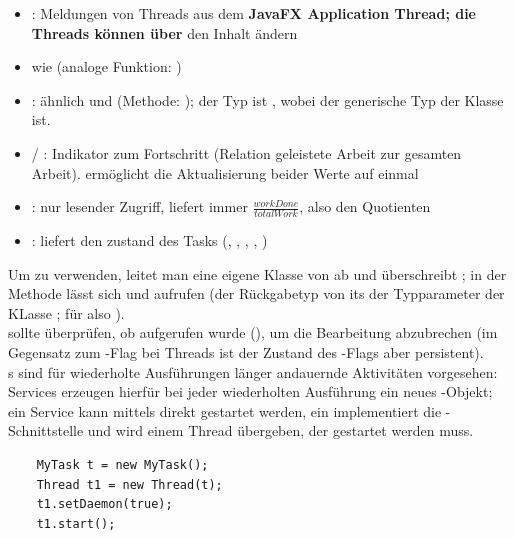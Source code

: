 \begin{itemize}
    \item {}: Meldungen von Threads aus dem \textbf{JavaFX Application Thread; die Threads können über } den Inhalt ändern
    \item {} wie  (analoge Funktion: )
    \item {}: ähnlich  und  (Methode: ); der Typ ist , wobei  der generische Typ der Klasse  ist.
    \item {} / : Indikator zum Fortschritt (Relation geleistete Arbeit zur gesamten Arbeit).
     ermöglicht die Aktualisierung beider Werte auf einmal
    \item {}: nur lesender Zugriff, liefert immer $\frac{workDone}{totalWork}$, also den Quotienten
    \item {}: liefert den zustand des Tasks (, , , , )
\end{itemize}

Um  zu verwenden, leitet man eine eigene Klasse von  ab und überschreibt ; in der Methode lässt sich  und  aufrufen (der Rückgabetyp von  its der Typparameter der KLasse ; für  also ).\\
 sollte überprüfen, ob  aufgerufen wurde (), um die Bearbeitung abzubrechen (im Gegensatz zum -Flag bei Threads ist der Zustand des -Flags aber persistent).\\

\noindent
{}s sind für wiederholte Ausführungen länger andauernde Aktivitäten vorgesehen: Services erzeugen hierfür bei jeder wiederholten Ausführung ein neues -Objekt; ein Service kann mittels  direkt gestartet werden, ein  implementiert die -Schnittstelle und wird einem Thread übergeben, der gestartet werden muss.

\begin{verbatim}
    MyTask t = new MyTask();
    Thread t1 = new Thread(t);
    t1.setDaemon(true);
    t1.start();
\end{verbatim}\\

